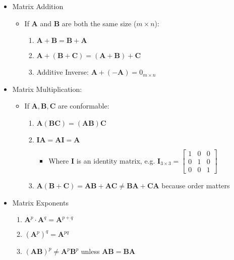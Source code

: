 \begin{itemize}
    
    \item Matrix Addition
    \begin{itemize}
        \item If $\bm{A}$ and $\bm{B}$ are both the same size ($m \times n$):
        \begin{enumerate}
            \item $\bm{A} + \bm{B} = \bm{B} + \bm{A}$
            \item $\bm{A} + (\bm{B} + \bm{C}) = (\bm{A} + \bm{B}) + \bm{C}$
            \item Additive Inverse: $\bm{A} + (- \bm{A}) = 0_{m \times n}$  
        \end{enumerate}
    \end{itemize}

    \item Matrix Multiplication:
    \begin{itemize}
        \item If $\bm{A}, \bm{B}, \bm{C}$ are conformable:
        \begin{enumerate}
            \item $\bm{A}(\bm{B}\bm{C}) = (\bm{A}\bm{B})\bm{C}$
            \item $\bm{I}\bm{A} = \bm{A}\bm{I} = \bm{A}$
            \begin{itemize}
                \item Where $\bm{I}$ is an identity matrix, e.g. $\bm{I}_{3 \times 3} = 
                \begin{bmatrix}
                    1 & 0 & 0 \\
                    0 & 1 & 0 \\
                    0 & 0 & 1    
                \end{bmatrix}$
            \end{itemize}
            \item $\bm{A}(\bm{B} + \bm{C}) = \bm{AB} + \bm{AC} \neq \bm{BA} + \bm{CA}$ because order matters
        \end{enumerate}
    \end{itemize}

    \item Matrix Exponents
    \begin{enumerate}
        \item $\bm{A}^p \cdot \bm{A}^q = \bm{A}^{p + q}$
        \item $(\bm{A}^p)^q = \bm{A}^{pq}$ 
        \item $(\bm{A}\bm{B})^p \neq \bm{A}^p\bm{B}^p$ unless $\bm{AB} = \bm{BA}$
    \end{enumerate}
    

\end{itemize}
